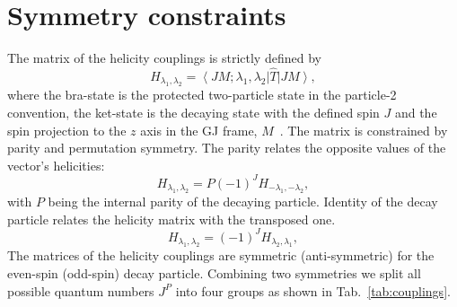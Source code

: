 \documentclass[prd,preprintnumbers,floatfix,
nofootinbib,superscriptaddress]{revtex4}
\newcommand{\ket}[1]{\ensuremath{\left|#1\right\rangle}}
\newcommand{\bra}[1]{\ensuremath{\left\langle #1\right|}}
\begin{document}
%


\section{Symmetry constraints} \label{sec:symmetries}
The matrix of the helicity couplings is strictly defined by
\begin{equation} \label{eq:helicity.def}
  H_{\lambda_1,\lambda_2} = \bra{JM;\lambda_1,\lambda_2}\hat{T}\ket{JM},
\end{equation}
where the bra-state is the protected two-particle state in the particle-2 convention,
the ket-state is the decaying state with the defined spin $J$ and the spin projection to the $z$ axis in the GJ frame, $M$~\cite{Martin.Spearman}.
The matrix is constrained by parity and permutation symmetry.
The parity relates the opposite values of the vector's helicities:
\begin{equation} \label{eq:parity}
H_{\lambda_1,\lambda_2} = P (-1)^J H_{-\lambda_1,-\lambda_2},
\end{equation}
with $P$ being the internal parity of the decaying particle.
Identity of the decay particle relates the helicity matrix with the transposed one.
\begin{equation} \label{eq:permutation}
H_{\lambda_1,\lambda_2} = (-1)^J H_{\lambda_2,\lambda_1},
\end{equation}
The matrices of the helicity couplings are symmetric (anti-symmetric) for the even-spin (odd-spin) decay particle.
Combining two symmetries we split all possible quantum numbers $J^P$ into four groups as shown in Tab.~\ref{tab:couplings}.
\end{document}
